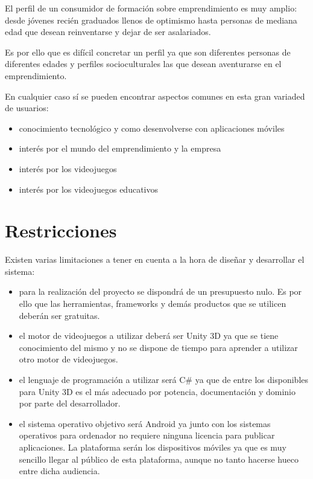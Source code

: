 El perfil de un consumidor de formación sobre emprendimiento es muy amplio: desde jóvenes recién graduados llenos de optimismo hasta personas de mediana edad que desean reinventarse y dejar de ser asalariados. 

Es por ello que es difícil concretar un perfil ya que son diferentes personas de diferentes edades y perfiles socioculturales las que desean aventurarse en el emprendimiento.

En cualquier caso sí se pueden encontrar aspectos comunes en esta gran variaded de usuarios:

\begin{itemize}

\item conocimiento tecnológico y como desenvolverse con aplicaciones móviles
\item interés por el mundo del emprendimiento y la empresa
\item interés por los videojuegos
\item interés por los videojuegos educativos

\end{itemize}

\section{Restricciones}

Existen varias limitaciones a tener en cuenta a la hora de diseñar y desarrollar el sistema:

\begin{itemize}

\item para la realización del proyecto se dispondrá de un presupuesto nulo. Es por ello que las herramientas, frameworks y demás productos que se utilicen deberán ser gratuitas.
\item el motor de videojuegos a utilizar deberá ser Unity 3D ya que se tiene conocimiento del mismo y no se dispone de tiempo para aprender a utilizar otro motor de videojuegos.
\item el lenguaje de programación a utilizar será C\# ya que de entre los disponibles para Unity 3D es el más adecuado por potencia, documentación y dominio por parte del desarrollador.
\item el sistema operativo objetivo será Android ya junto con los sistemas operativos para ordenador no requiere ninguna licencia para publicar aplicaciones. La plataforma serán los dispositivos móviles ya que es muy sencillo llegar al público de esta plataforma, aunque no tanto hacerse hueco entre dicha audiencia.

\end{itemize}

